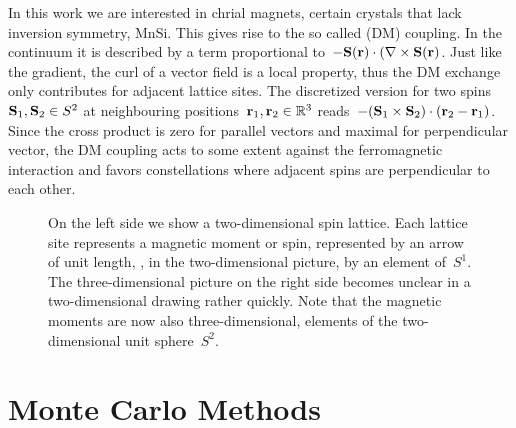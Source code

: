 In this work we are interested in chrial magnets, certain crystals that lack
inversion symmetry, \eg{} MnSi. This gives rise to the so called  (DM) coupling. In the continuum it is described by a term
proportional to~$-\S(\r) \cdot (\nabla \times \S(\r)$. Just like the gradient,
the curl of a vector field is a local property, thus the DM exchange only
contributes for adjacent lattice sites. The discretized version for two
spins~$\S_1, \S_2 \in S^2$ at neighbouring positions~$\r_1, \r_2 \in \bR^3$
 reads~$- (\S_1 \times \S_2) \cdot (\r_2 - \r_1)$.
Since the cross product is zero for parallel vectors and maximal for
perpendicular vector, the DM coupling acts to some extent against the
ferromagnetic interaction and favors constellations where adjacent spins are
perpendicular to each other.



\begin{figure}
  \centering
  \caption{On the left side we show a two-dimensional spin lattice. Each lattice
  site represents a magnetic moment or spin, represented by an arrow of unit
  length, \ie{}, in the two-dimensional picture, by an element of~$S^1$. The
  three-dimensional picture on the right side becomes unclear in a
  two-dimensional drawing rather quickly. Note that the magnetic moments are now
  also three-dimensional, \ie{} elements of the two-dimensional unit
  sphere~$S^2$.}
\label{fig:lattice}
\end{figure}

\begin{figure}
  \centering
  \caption{\todo{}}
\label{fig:interact}
\end{figure}
%
\section{Monte Carlo Methods}\label{sec:mctheory}
%
\todo{}
